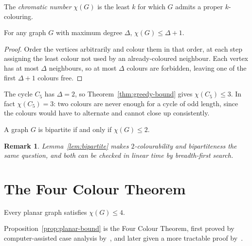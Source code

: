 \documentclass[lang=en,12pt]{beautybook}
\newtheorem*{remark}{\textbf{Remark}}
\begin{document}
\begin{defi}
\label{def:chromatic}
The \emph{chromatic number} $\chi(G)$ is the least $k$ for which $G$
admits a proper $k$-colouring.
\end{defi}

\begin{thm}
\label{thm:greedy-bound}
For any graph $G$ with maximum degree $\Delta$, $\chi(G) \leq \Delta + 1$.
\end{thm}

\begin{proof}
Order the vertices arbitrarily and colour them in that order, at each step
assigning the least colour not used by an already-coloured neighbour.
Each vertex has at most $\Delta$ neighbours, so at most $\Delta$ colours
are forbidden, leaving one of the first $\Delta + 1$ colours free.
\end{proof}

\begin{exam}
\label{exam:cycle}
The cycle $C_5$ has $\Delta = 2$, so Theorem~\ref{thm:greedy-bound} gives
$\chi(C_5) \leq 3$. In fact $\chi(C_5) = 3$: two colours are never enough
for a cycle of odd length, since the colours would have to alternate and
cannot close up consistently.
\end{exam}

\begin{lem}
\label{lem:bipartite}
A graph $G$ is bipartite if and only if $\chi(G) \leq 2$.
\end{lem}

\begin{remark}
Lemma~\ref{lem:bipartite} makes $2$-colourability and bipartiteness the
same question, and both can be checked in linear time by breadth-first
search.
\end{remark}

\chapter{The Four Colour Theorem}
\label{ch:four-colour}

\begin{prop}
\label{prop:planar-bound}
Every planar graph satisfies $\chi(G) \leq 4$.
\end{prop}

Proposition~\ref{prop:planar-bound} is the Four Colour Theorem, first
proved by computer-assisted case analysis
by~\citet{appel1977four}, and later given a more tractable
proof by~\citet{robertson1997four}.



\end{document}
